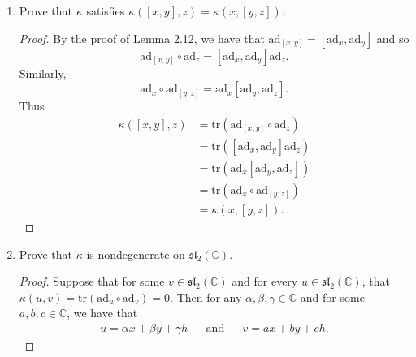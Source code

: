 \documentclass[12pt]{article}
\theoremstyle{definition}
\begin{document}
\begin{enumerate}
\begin{enumerate}[label=(\alph*)]
                \item Prove that $\kappa$ satisfies $\kappa([x, y], z)=\kappa(x,[y,z])$.
                    \begin{proof}
                        By the proof of Lemma 2.12, we have that $\text{ad}_{[x, y]}=[\text{ad}_x,\text{ad}_y]$ and so 
                            \begin{equation*}
                                \text{ad}_{[x,y]}\circ\text{ad}_z=[\text{ad}_x,\text{ad}_y]\text{ad}_z.
                            \end{equation*}
                        Similarly, 
                            \begin{equation*}
                                \text{ad}_x\circ\text{ad}_{[y,z]}=\text{ad}_x[\text{ad}_y,\text{ad}_z].
                            \end{equation*}
                        Thus 
                            \begin{equation*}
                                \begin{split}
                                    \kappa([x,y],z)&=\text{tr}(\text{ad}_{[x,y]}\circ\text{ad}_z) \\
                                    &=\text{tr}([\text{ad}_x,\text{ad}_y]\text{ad}_z) \\
                                    &=\text{tr}(\text{ad}_x[\text{ad}_y,\text{ad}_z]) \\
                                    &=\text{tr}(\text{ad}_x\circ\text{ad}_{[y,z]}) \\
                                    &=\kappa(x,[y,z]).
                                \end{split}
                            \end{equation*}
                    \end{proof}
                \item Prove that $\kappa$ is nondegenerate on $\mathfrak{sl}_2(\mathbb{C})$.
                    \begin{proof}
                        Suppose that for some $v\in\mathfrak{sl}_2(\mathbb{C})$ and for every $u\in\mathfrak{sl}_2(\mathbb{C})$, that $\kappa(u,v)=\text{tr}(\text{ad}_u\circ\text{ad}_v)=0$. Then for any $\alpha,\beta,\gamma\in\mathbb{C}$ and for some $a,b,c\in\mathbb{C}$, we have that 
                            \begin{align*}
                                u = \alpha x+\beta y+\gamma h& &\text{and}& &v = ax+by+ch. 
                            \end{align*}

\end{proof}
\end{enumerate}
\end{enumerate}
\end{document}
